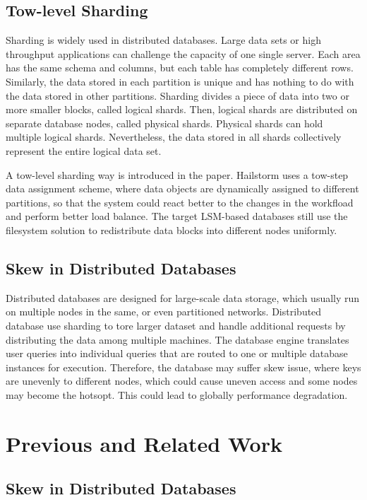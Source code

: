 \documentclass[a4paper,10pt,twoside]{article}
\begin{document}
\subsection{Tow-level Sharding}
Sharding is widely used in distributed databases. Large data sets or high throughput applications can challenge the capacity of one single server.
Each area has the same schema and columns, but each table has completely different rows. 
Similarly, the data stored in each partition is unique and has nothing to do with the data stored in other partitions.
Sharding divides a piece of data into two or more smaller blocks, called logical shards.
Then, logical shards are distributed on separate database nodes, called physical shards.
Physical shards can hold multiple logical shards. 
Nevertheless, the data stored in all shards collectively represent the entire logical data set.
\par
A tow-level sharding way is introduced in the paper\cite{mainpaper}. 
Hailstorm uses a tow-step data assignment scheme, where data objects are dynamically assigned to different partitions, 
so that the system could react better to the changes in the workfload and perform better load balance.
The target LSM-based databases still use the filesystem solution to redistribute data blocks into different nodes uniformly.


\subsection{Skew in Distributed Databases}

Distributed databases \cite{mongodb,tidb} are designed for large-scale data storage, which usually run on multiple nodes in the same,
or even partitioned networks.
Distributed database use sharding to tore larger dataset and handle additional requests by distributing the data among multiple machines.
The database engine translates user queries into individual queries that are routed to one or multiple database instances for execution.
Therefore, the database may suffer skew issue, where keys are unevenly to different nodes, which could cause uneven access and some nodes may become the hotsopt.
This could lead to globally performance degradation.



\section{Previous and Related Work}

\subsection{Skew in Distributed Databases}
\end{document}
